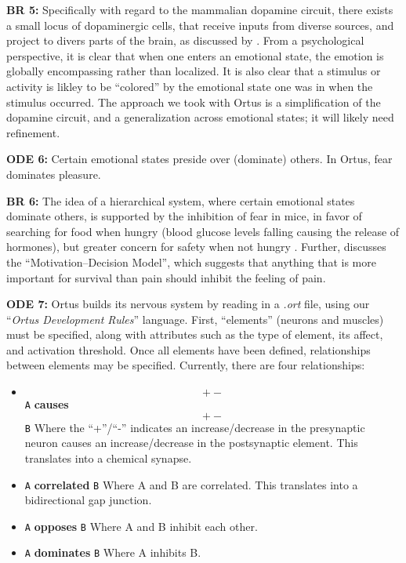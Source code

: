 \documentclass[letterpaper]{article}
\begin{document}
\textbf{BR 5:} Specifically with regard to the mammalian dopamine circuit, there exists a small locus of dopaminergic cells, that receive inputs from diverse sources, and project to divers parts of the brain, as discussed by \citet{Beier2015}. From a psychological perspective, it is clear that when one enters an emotional state, the emotion is globally encompassing rather than localized. It is also clear that a stimulus or activity is likley to be ``colored'' by the emotional state one was in when the stimulus occurred. The approach we took with Ortus is a simplification of the dopamine circuit, and a generalization across emotional states; it will likely need refinement.

\textbf{ODE 6:} Certain emotional states preside over (dominate) others. In Ortus, fear dominates pleasure.

\textbf{BR 6:} The idea of a hierarchical system, where certain emotional states dominate others, is supported by the inhibition of fear in mice, in favor of searching for food when hungry (blood glucose levels falling causing the release of hormones), but greater concern for safety when not hungry \citep{Verma2015}. Further, \citet{Leknes2008} discusses the ``Motivation--Decision Model'', which suggests that anything that is more important for survival than pain should inhibit the feeling of pain.


\textbf{ODE 7:} Ortus builds its nervous system by reading in a \textit{.ort} file, using our ``\textit{Ortus Development Rules}'' language. First, ``elements'' (neurons and muscles) must be specified, along with attributes such as the type of element, its affect, and activation threshold. Once all elements have been defined, relationships between elements may be specified. Currently, there are four relationships:
\begin{itemize}
    \itemsep0em
    \item \texttt{\[+-\]A} \textbf{causes} \texttt{\[+-\]B}
        \subitem Where the ``+''/``-'' indicates an increase/decrease in the presynaptic neuron causes an increase/decrease in the postsynaptic element. This translates into a chemical synapse.
    \item \texttt{A} \textbf{correlated} \texttt{B}
        \subitem Where A and B are correlated. This translates into a bidirectional gap junction.
    \item \texttt{A} \textbf{opposes} \texttt{B}
        \subitem Where A and B inhibit each other.
     \item \texttt{A} \textbf{dominates} \texttt{B}
         \subitem Where A inhibits B.
\end{itemize}
\end{document}
